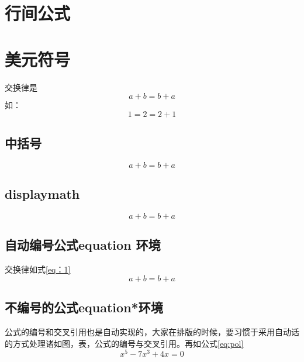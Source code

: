 \documentclass{ctexart}
\begin{document}
	
	\section{行间公式}
	\section{美元符号}
	
	交换律是 $$a+b = b+a$$
	如：$$1=2 = 2+1 $$
	
	\subsection{中括号}
	\[ a +b=b+a \]
	
	\subsection{displaymath}
	\begin{displaymath}	
		a +b = b+a
	\end{displaymath}
	
	\subsection{自动编号公式equation 环境}
	
	交换律如式\ref{eq：1}
	\begin{equation}
		a + b = b+a  \label{eq：1}
	\end{equation}
	
	
	\subsection{不编号的公式equation*环境}
	
	公式的编号和交叉引用也是自动实现的，大家在排版的时候，要习惯于采用自动话
	的方式处理诸如图，表，公式的编号与交叉引用。再如公式\ref{eq:pol}
	\begin{equation}
		x^5 - 7x^3+4x=0 \label{eq:pol}
	\end{equation}	
	
	
	
	
	
\end{document}
